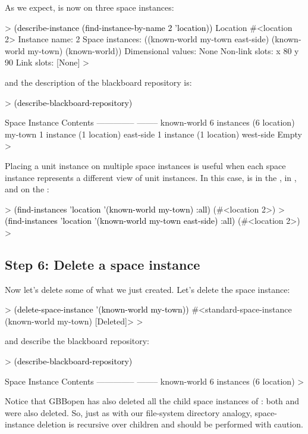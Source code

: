 \documentclass[10pt,twoside,english,pdftex]{article}
\begin{document}
%
%
As we expect,   is now on three space instances:
%
\begin{example}\color{darkergray}%
  > \textcolor{black}{(describe-instance (find-instance-by-name 2 'location))}
  Location #<location 2>
    Instance name: 2
    Space instances: ((known-world my-town east-side) (known-world my-town)
                      (known-world))
    Dimensional values: None
    Non-link slots:
      x 80
      y 90
    Link slots:
      [None]
  >
\end{example}
%
and the description of the blackboard repository is:
%
\begin{example}\color{darkergray}%
  > \textcolor{black}{(describe-blackboard-repository)}

  Space Instance                Contents
  --------------                --------
  known-world                   6 instances (6 location)
     my-town                    1 instance (1 location)
        east-side               1 instance (1 location)
        west-side               Empty
  >
\end{example}

Placing a unit instance on multiple space instances is useful when each space
instance represents a different view of unit instances.  In this case,
  is in the , in , and
on the :
%
\begin{example}\color{darkergray}%
  > \textcolor{black}{(find-instances 'location '(known-world my-town) :all)}
  (#<location 2>)
  > \textcolor{black}{(find-instances 'location '(known-world my-town east-side) :all)}
  (#<location 2>)
  >
\end{example}

\subsection*{Step 6: Delete a space instance}

%
%
Now let's delete some of what we just created.  Let's delete the
 space instance:
%
\begin{example}\color{darkergray}%
  > \textcolor{black}{(delete-space-instance '(known-world my-town))}
  #<standard-space-instance (known-world my-town) [Deleted]>
  >
\end{example}
%
%
and describe the blackboard repository:
%
\begin{example}\color{darkergray}%
  > \textcolor{black}{(describe-blackboard-repository)}

  Space Instance                Contents
  --------------                --------
  known-world                   6 instances (6 location)
  >
\end{example}
%
Notice that GBBopen has also deleted all the child space instances of
: both  and  were also deleted.
So, just as with our file-system directory analogy, space-instance deletion is
recursive over children and should be performed with caution.  
\end{document}
